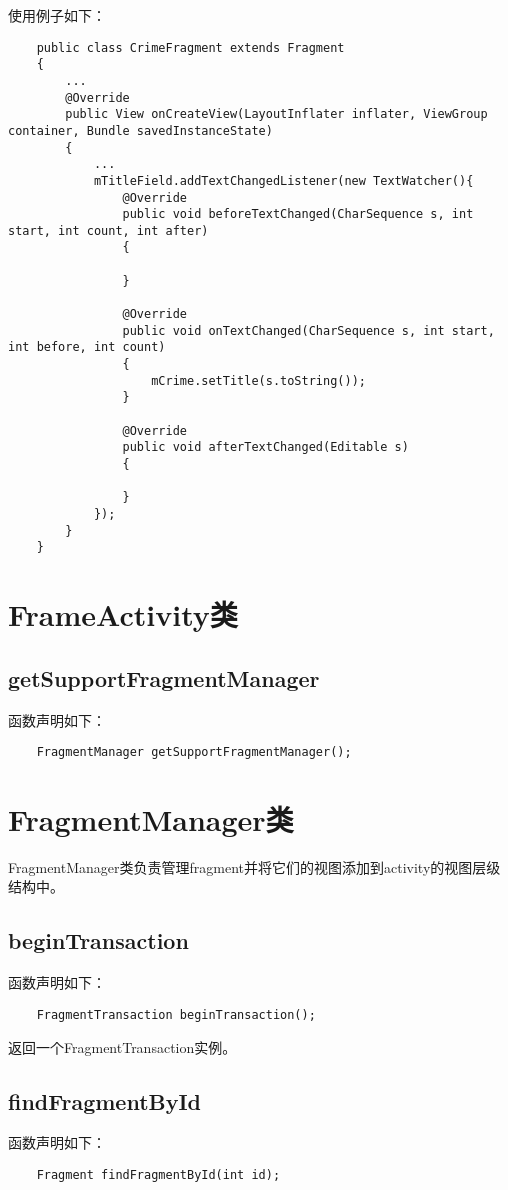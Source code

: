 \documentclass[a4paper,left=2.5cm,right=2.5cm,11pt]{article}
\begin{document}
	使用例子如下：
	\begin{lstlisting}
	public class CrimeFragment extends Fragment
	{
		...
		@Override
		public View onCreateView(LayoutInflater inflater, ViewGroup container, Bundle savedInstanceState)
		{
			...
			mTitleField.addTextChangedListener(new TextWatcher(){
				@Override
				public void beforeTextChanged(CharSequence s, int start, int count, int after)
				{

				}

				@Override
				public void onTextChanged(CharSequence s, int start, int before, int count)
				{
					mCrime.setTitle(s.toString());
				}

				@Override
				public void afterTextChanged(Editable s)
				{

				}
			});
		}
	}
	\end{lstlisting}

\section{FrameActivity类}
\subsection{getSupportFragmentManager}
	函数声明如下：
	\begin{lstlisting}
	FragmentManager getSupportFragmentManager();
	\end{lstlisting}

\section{FragmentManager类}
	FragmentManager类负责管理fragment并将它们的视图添加到activity的视图层级结构中。

\subsection{beginTransaction}
	函数声明如下：
	\begin{lstlisting}
	FragmentTransaction beginTransaction();
	\end{lstlisting}

	返回一个FragmentTransaction实例。

\subsection{findFragmentById}
	函数声明如下：
	\begin{lstlisting}
	Fragment findFragmentById(int id);
	\end{lstlisting}
\end{document}
